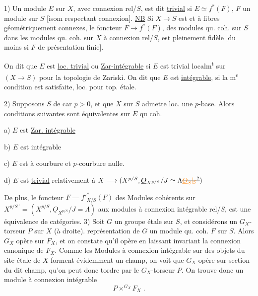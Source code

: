 1) Un module  $E$ sur $X$, avec connexion rel/$S$, est dit  \uline{trivial} si $E\simeq f^\ast(F)$, $F$ un module  sur $S$ [isom respectant connexion].  \uline{NB} Si $X\longrightarrow S$ est   et à fibres géométriquement connexes,  le foncteur $F\longrightarrow f^\ast(F)$, des modules qu. coh. sur $S$ dans les modules qu. coh. sur $X$ à connexion rel/$S$, est pleinement fidèle [du moins si $F$ de présentation finie].

On dit que $E$ est \uline{loc. trivial} ou \uline{Zar-intégrable} si $E$ est trivial localm\textsuperscript{t} sur $(X\longrightarrow S)$ pour la topologie de Zariski. On dit que $E$ est \uline{intégrable}, si la m\textsuperscript{e} condition est satisfaite, loc. pour top. étale.

2) Supposons $S$ de car $p>0$, et que $X$ sur $S$ admette loc. une $p$-base. Alors  conditions suivantes sont équivalentes sur $E$ qu coh.

a) $E$ est \uline{Zar. intégrable}

b) $E$ est intégrable

c) $E$ est à courbure et $p$-courbure nulle.

d) $E$ est \uline{trivial} relativement à $X\longrightarrow(X^{p/S},\underline O_{X^{p/S}}/J\simeq\Lambda\deleted{\unsure{\underline O_S|{}_{\!S}}})$

De plus, le foncteur $F\mathrel{\text{---}}{f'}_{X/S}^\ast(F)$ des Modules cohérents sur $X^{p/S\,\prime}=(X^{p/S},\underline O_{X^{p/S}}/J=\Lambda)$ aux modules  à connexion intégrable rel/$S$, est une équivalence de catégories.
3) Soit $G$ un groupe  étale sur $S$, et considérons un $G_X$-torseur $P$ sur $X$ (à droite).   représentation de $G$  un module qu. coh. $F$ sur $S$. Alors $G_X$ opère sur $F_X$, et on constate qu'il opère en laissant invariant la connexion canonique de $F_X$. Comme les Modules à connexion intégrable  sur des objets du site étale de $X$ forment évidemment un champ, on voit que $G_X$  opère sur  section  du dit  champ, qu'on peut donc tordre par le $G_X$-torseur $P$. On trouve donc un module à connexion intégrable
\[
 P\mathbin{\times^{G_X}} F_X\; .
\]

